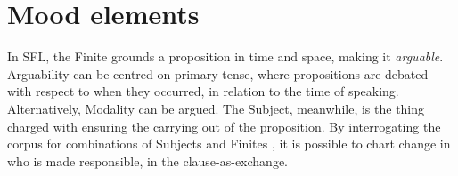


\FloatBarrier
\section{Mood elements}

In \gls{SFL}, the Finite grounds a proposition in time and space, making it \emph{arguable}. Arguability can be centred on primary tense, where propositions are debated with respect to when they occurred, in relation to the time of speaking. Alternatively, Modality can be argued. The Subject, meanwhile, is the thing charged with ensuring the carrying out of the proposition. By interrogating the \gls{corpus} for combinations of Subjects and Finites \cite[see][]{eggins_introduction_2004}, it is possible to chart change in who is made responsible, in the clause\hyp{}as\hyp{}exchange.

